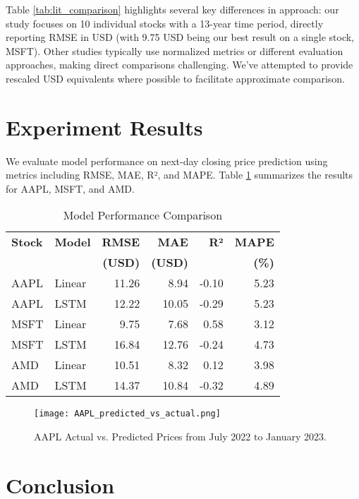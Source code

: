 \documentclass[sigconf]{acmart}
\begin{document}
Table \ref{tab:lit_comparison} highlights several key differences in approach: our study focuses on 10 individual stocks with a 13-year time period, directly reporting RMSE in USD (with 9.75 USD being our best result on a single stock, MSFT). Other studies typically use normalized metrics or different evaluation approaches, making direct comparisons challenging. We've attempted to provide rescaled USD equivalents where possible to facilitate approximate comparison.

\section{Experiment Results}

We evaluate model performance on next-day closing price prediction using metrics including RMSE, MAE, R², and MAPE. Table \ref{tab:performance} summarizes the results for AAPL, MSFT, and AMD.

\begin{table}[h]
\caption{Model Performance Comparison}
\label{tab:performance}
\small
\begin{tabular}{llrrrr}
\toprule
\textbf{Stock} & \textbf{Model} & \textbf{RMSE} & \textbf{MAE} & \textbf{R²} & \textbf{MAPE} \\
 & & \textbf{(USD)} & \textbf{(USD)} & & \textbf{(\%)} \\
\midrule
AAPL & Linear & 11.26 & 8.94 & -0.10 & 5.23 \\
AAPL & LSTM   & 12.22 & 10.05 & -0.29 & 5.23 \\
MSFT & Linear & 9.75  & 7.68 & 0.58  & 3.12 \\
MSFT & LSTM   & 16.84 & 12.76 & -0.24 & 4.73 \\
AMD  & Linear & 10.51 & 8.32 & 0.12  & 3.98 \\
AMD  & LSTM   & 14.37 & 10.84 & -0.32 & 4.89 \\
\bottomrule
\end{tabular}
\end{table}

\begin{figure}[h]
\centering
\texttt{[image: AAPL\_predicted\_vs\_actual.png]}
\caption{AAPL Actual vs. Predicted Prices from July 2022 to January 2023.}
\label{fig:aapl_pred}
\end{figure}

\section{Conclusion}
\end{document}
